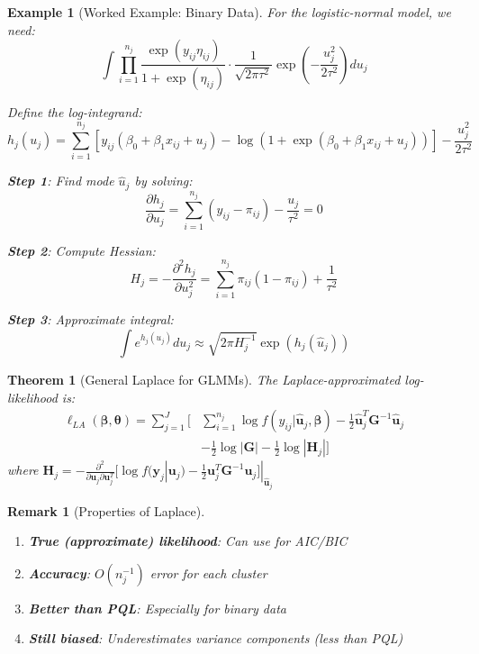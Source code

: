 \documentclass{article}
\newtheorem{theorem}{Theorem}
\newtheorem{remark}{Remark}
\newtheorem{example}{Example}
\begin{document}
\begin{example}[Worked Example: Binary Data]
For the logistic-normal model, we need:
\begin{equation}
\int \prod_{i=1}^{n_j} \frac{\exp(y_{ij}\eta_{ij})}{1 + \exp(\eta_{ij})} \cdot \frac{1}{\sqrt{2\pi\tau^2}}\exp\left(-\frac{u_j^2}{2\tau^2}\right) du_j
\end{equation}

Define the log-integrand:
\begin{equation}
h_j(u_j) = \sum_{i=1}^{n_j} [y_{ij}(\beta_0 + \beta_1 x_{ij} + u_j) - \log(1 + \exp(\beta_0 + \beta_1 x_{ij} + u_j))] - \frac{u_j^2}{2\tau^2}
\end{equation}

\textbf{Step 1}: Find mode $\hat{u}_j$ by solving:
\begin{equation}
\frac{\partial h_j}{\partial u_j} = \sum_{i=1}^{n_j} (y_{ij} - \pi_{ij}) - \frac{u_j}{\tau^2} = 0
\end{equation}

\textbf{Step 2}: Compute Hessian:
\begin{equation}
H_j = -\frac{\partial^2 h_j}{\partial u_j^2} = \sum_{i=1}^{n_j} \pi_{ij}(1-\pi_{ij}) + \frac{1}{\tau^2}
\end{equation}

\textbf{Step 3}: Approximate integral:
\begin{equation}
\int e^{h_j(u_j)} du_j \approx \sqrt{2\pi H_j^{-1}} \exp(h_j(\hat{u}_j))
\end{equation}
\end{example}

\begin{theorem}[General Laplace for GLMMs]
The Laplace-approximated log-likelihood is:
\begin{align}
\ell_{LA}(\boldsymbol{\beta}, \boldsymbol{\theta}) = \sum_{j=1}^J \Bigg[&\sum_{i=1}^{n_j} \log f(y_{ij}|\hat{\mathbf{u}}_j, \boldsymbol{\beta}) - \frac{1}{2}\hat{\mathbf{u}}_j^T\mathbf{G}^{-1}\hat{\mathbf{u}}_j \\
&- \frac{1}{2}\log|\mathbf{G}| - \frac{1}{2}\log|\mathbf{H}_j| \Bigg]
\end{align}
where $\mathbf{H}_j = -\frac{\partial^2}{\partial \mathbf{u}_j \partial \mathbf{u}_j^T}[\log f(\mathbf{y}_j|\mathbf{u}_j) - \frac{1}{2}\mathbf{u}_j^T\mathbf{G}^{-1}\mathbf{u}_j]|_{\hat{\mathbf{u}}_j}$
\end{theorem}

\begin{remark}[Properties of Laplace]
\begin{enumerate}
    \item \textbf{True (approximate) likelihood}: Can use for AIC/BIC
    \item \textbf{Accuracy}: $O(n_j^{-1})$ error for each cluster
    \item \textbf{Better than PQL}: Especially for binary data
    \item \textbf{Still biased}: Underestimates variance components (less than PQL)
\end{enumerate}
\end{remark}
\end{document}
